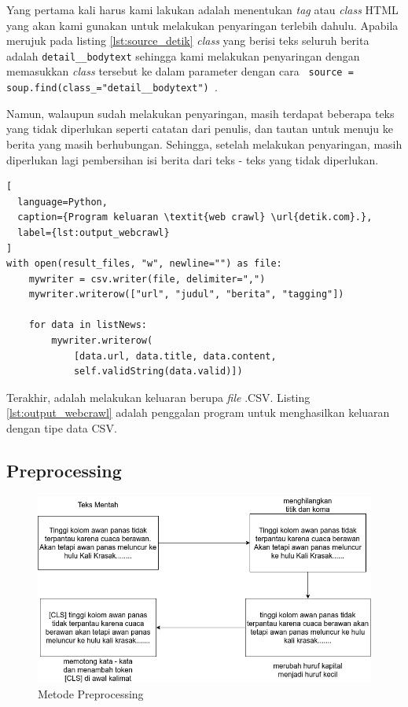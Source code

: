 Yang pertama kali harus kami lakukan adalah menentukan \textit{tag} atau \textit{class} HTML yang akan kami gunakan untuk melakukan penyaringan terlebih dahulu. Apabila merujuk pada listing \ref{lst:source_detik} \textit{class} yang berisi teks seluruh berita adalah \texttt{detail\_\_body\-text} sehingga kami melakukan penyaringan dengan memasukkan \textit{class} tersebut ke dalam parameter dengan cara \texttt{ source = soup.find(class\_="detail\_\_body\-text") }.

Namun, walaupun sudah melakukan penyaringan, masih terdapat beberapa teks yang tidak diperlukan seperti catatan dari penulis, dan tautan untuk menuju ke berita yang masih berhubungan. Sehingga, setelah melakukan penyaringan, masih diperlukan lagi pembersihan isi berita dari teks - teks yang tidak diperlukan.

\begin{lstlisting}[
  language=Python,
  caption={Program keluaran \textit{web crawl} \url{detik.com}.},
  label={lst:output_webcrawl}
]
with open(result_files, "w", newline="") as file:
    mywriter = csv.writer(file, delimiter=",")
    mywriter.writerow(["url", "judul", "berita", "tagging"])

    for data in listNews:
        mywriter.writerow(
            [data.url, data.title, data.content, 
            self.validString(data.valid)])

\end{lstlisting}

Terakhir, adalah melakukan keluaran berupa \textit{file} .CSV. Listing \ref{lst:output_webcrawl} adalah penggalan program untuk menghasilkan keluaran dengan tipe data CSV.

\subsection{Preprocessing}

\begin{figure}[h!]
    \begin{center}
        \includegraphics[width= 0.8\linewidth]{gambar/preprocess.png}
        \caption{Metode Preprocessing}
        \label{fig: metodologi_preprocessing}
    \end{center}
\end{figure}

